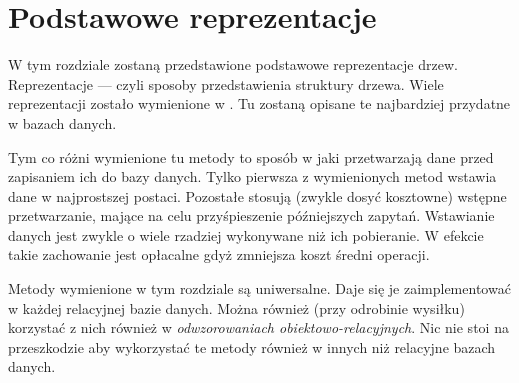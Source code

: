 \chapter{Podstawowe reprezentacje}

W tym rozdziale zostaną przedstawione podstawowe reprezentacje drzew.
Reprezentacje --- czyli sposoby przedstawienia struktury drzewa.
Wiele reprezentacji zostało wymienione w \cite{knuth}.
Tu zostaną opisane te najbardziej przydatne w bazach danych.




Tym co różni wymienione tu metody to sposób w jaki przetwarzają dane przed zapisaniem ich do bazy danych.
Tylko pierwsza z wymienionych metod wstawia dane w najprostszej postaci.
Pozostałe stosują (zwykle dosyć kosztowne) wstępne przetwarzanie, 
mające na celu przyśpieszenie późniejszych zapytań.
Wstawianie danych jest zwykle o wiele rzadziej wykonywane niż ich pobieranie.
W efekcie takie zachowanie jest opłacalne gdyż zmniejsza koszt średni operacji.


Metody wymienione w tym rozdziale są uniwersalne.
Daje się je zaimplementować w każdej relacyjnej bazie danych. 
Można również (przy odrobinie wysiłku) korzystać z nich również w \emph{odwzorowaniach obiektowo-relacyjnych}.
Nic nie stoi na przeszkodzie aby wykorzystać te metody również w innych niż relacyjne bazach danych.

